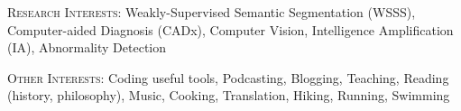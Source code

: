 \documentclass[12pt]{cv_style}
\begin{document}
\begin{ditem}
	\item \textsc{Research Interests:} Weakly-Supervised Semantic Segmentation (WSSS), Computer-aided Diagnosis (CADx), Computer Vision, Intelligence Amplification (IA), Abnormality Detection
	\item \textsc{Other Interests:} Coding useful tools, Podcasting, Blogging, Teaching, Reading (history, philosophy), Music, Cooking, Translation, Hiking, Running, Swimming
\end{ditem}


%
\end{document}
